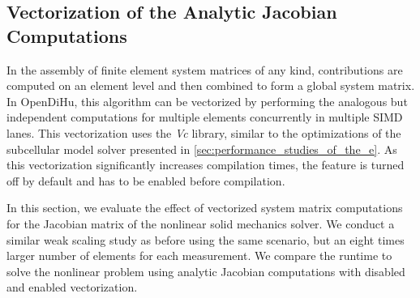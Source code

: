 

\subsection{Vectorization of the Analytic Jacobian Computations}\label{sec:vectorization_analytic_jacobian}

In the assembly of finite element system matrices of any kind, contributions are computed on an element level and then combined to form a global system matrix. In OpenDiHu, this algorithm can be vectorized by performing the analogous but independent computations for multiple elements concurrently in multiple SIMD lanes. This vectorization uses the \emph{Vc} library, similar to the optimizations of the subcellular model solver presented in \cref{sec:performance_studies_of_the_e}. As this vectorization significantly increases compilation times, the feature is turned off by default and has to be enabled before compilation.

In this section, we evaluate the effect of vectorized system matrix computations for the Jacobian matrix of the nonlinear solid mechanics solver. We conduct a similar weak scaling study as before using the same scenario, but an eight times larger number of elements for each measurement. We compare the runtime to solve the nonlinear problem using analytic Jacobian computations with disabled and enabled vectorization.

